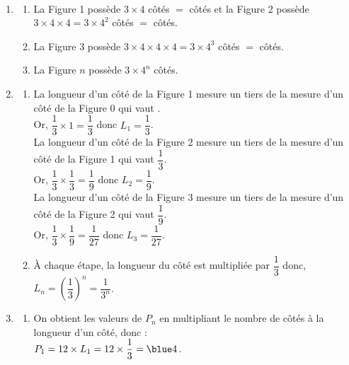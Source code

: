 \begin{corrige}
\ \\ [-5mm]
   \begin{enumerate}
      \item
         \begin{enumerate}
            \item La Figure 1 possède $3\times4$ côtés $=$ { côtés} et la Figure 2 possède $3\times4\times4 =3\times4^2$ côtés $=$ { côtés}.
            \item La Figure 3 possède $3\times4\times4\times4 =3\times4^3$ côtés $=$ { côtés}.
            \item La Figure $n$ possède {\blue $3\times4^n$ côtés}.
         \end{enumerate}
      \setcounter{enumi}{1}
      \item
         \begin{enumerate}
            \item La longueur d'un côté de la Figure 1 mesure un tiers de la mesure d'un côté de la Figure 0 qui vaut . \\ [1mm]
               Or, $\dfrac13\times1 =\dfrac13$ donc {\blue $L_1 =\dfrac13$}. \\
               La longueur d'un côté de la Figure 2 mesure un tiers de la mesure d'un côté de la Figure 1 qui vaut $\dfrac13$. \\
               Or, $\dfrac13\times\dfrac13 =\dfrac19$  donc {\blue $L_2 =\dfrac19$}. \\
               La longueur d'un côté de la Figure 3 mesure un tiers de la mesure d'un côté de la Figure 2 qui vaut $\dfrac19$. \\
               Or, $\dfrac13\times\dfrac19 =\dfrac{1}{27}$ donc {\blue $L_3 =\dfrac{1}{27}$}. \\ [1mm]
            \item À chaque étape, la longueur du côté est multipliée par $\dfrac13$ donc, {\blue $L_n =\left(\dfrac13\right)^n =\dfrac{1}{3^n}$}. \smallskip
         \end{enumerate}
      \setcounter{enumi}{2}
      \item
         \begin{enumerate}       
            \item On obtient les valeurs de $P_n$ en multipliant le nombre de côtés à la longueur d'un côté, donc : \\
               $P_1 =12\times L_1 =12\times\dfrac13 ={\blue 4}$. \\ [1mm]

\end{enumerate}
\end{enumerate}
\end{corrige}
